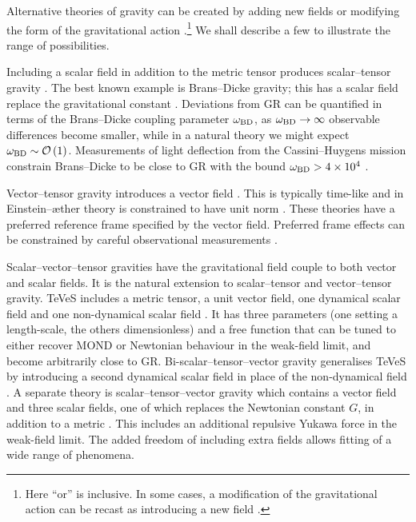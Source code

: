 Alternative theories of gravity can be created by adding new fields or modifying the form of the gravitational action \citep{Gair2012a}.\footnote{Here ``or'' is inclusive. In some cases, a modification of the gravitational action can be recast as introducing a new field \citep[e.g.,][]{Wands1994,Jacobson2010}.} We shall describe a few to illustrate the range of possibilities.

Including a scalar field in addition to the metric tensor produces scalar--tensor gravity \citep{Wagoner1970,Nordtvedt1970Jr,Fujii2003}. The best known example is Brans--Dicke gravity; this has a scalar field replace the gravitational constant \citep{Brans1961,Dicke1962}. Deviations from GR can be quantified in terms of the Brans--Dicke coupling parameter $\omega_\mathrm{BD}$, as $\omega_\mathrm{BD} \rightarrow \infty$ observable differences become smaller, while in a natural theory we might expect $\omega_\mathrm{BD} \sim \mathcal{O}\left({1}\right)$. Measurements of light deflection from the Cassini--Huygens mission \citep{Bertotti2003} constrain Brans--Dicke to be close to GR with the bound $\omega_\mathrm{BD} > 4 \times 10^4$ \citep{Will2006}.

Vector--tensor gravity introduces a vector field \citep{Will1972Jr,Nordtvedt1972Jr}. This is typically time-like and in Einstein--\ae{}ther theory is constrained to have unit norm \citep{Jacobson2001,Jacobson2008}. These theories have a preferred reference frame specified by the vector field. Preferred frame effects can be constrained by careful observational measurements \citep[chapter 8]{Will1993}.


Scalar--vector--tensor gravities have the gravitational field couple to both vector and scalar fields. It is the natural extension to scalar--tensor and vector--tensor gravity. TeVeS includes a metric tensor, a unit vector field, one dynamical scalar field and one non-dynamical scalar field \citep{Bekenstein2004,Skordis2009}. It has three parameters (one setting a length-scale, the others dimensionless) and a free function that can be tuned to either recover MOND or Newtonian behaviour in the weak-field limit, and become arbitrarily close to GR. Bi-scalar--tensor--vector gravity generalises TeVeS by introducing a second dynamical scalar field in place of the non-dynamical field \citep{Sanders2005}. A separate theory is scalar--tensor--vector gravity which contains a vector field and three scalar fields, one of which replaces the Newtonian constant $G$, in addition to a metric \citep{Moffat2006}. This includes an additional repulsive Yukawa force in the weak-field limit. The added freedom of including extra fields allows fitting of a wide range of phenomena.

